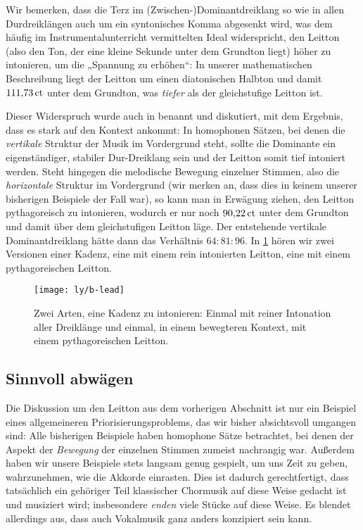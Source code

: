 Wir bemerken, dass die Terz im (Zwischen-)Dominantdreiklang so wie in allen
Durdreiklängen auch um ein syntonisches Komma abgesenkt wird, was dem häufig im
Instrumentalunterricht vermittelten Ideal widerspricht, den Leitton (also den
Ton, der eine kleine Sekunde unter dem Grundton liegt) höher zu intonieren, um
die „Spannung zu erhöhen“: In unserer mathematischen Beschreibung liegt der
Leitton um einen diatonischen Halbton und damit $111{,}73\,\text{ct}$ unter dem
Grundton, was \emph{tiefer} als der gleichstufige Leitton ist.

Dieser Widerspruch wurde auch in \cite[211]{viitasaari} benannt und
diskutiert, mit dem Ergebnis, dass es stark auf den Kontext ankommt: In
homophonen Sätzen, bei denen die \emph{vertikale} Struktur der Musik im
Vordergrund steht, sollte die Dominante ein eigenständiger, stabiler
Dur-Dreiklang sein und der Leitton somit tief intoniert werden. Steht hingegen
die melodische Bewegung einzelner Stimmen, also die \emph{horizontale} Struktur
im Vordergrund (wir merken an, dass dies in keinem unserer bisherigen Beispiele
der Fall war), so kann man in Erwägung ziehen, den Leitton pythagoreisch zu
intonieren, wodurch er nur noch $90{,}22\,\text{ct}$ unter dem Grundton und damit über
dem gleichstufigen Leitton läge. Der entstehende vertikale Dominantdreiklang
hätte dann das Verhältnis $64:81:96$. In \cref{fig:lead} hören wir zwei
Versionen einer Kadenz, eine mit einem rein intonierten Leitton, eine mit einem
pythagoreischen Leitton.

\begin{figure}
  \centering
  \texttt{[image: ly/b-lead]}
  \caption{Zwei Arten, eine Kadenz zu intonieren: Einmal mit reiner
    Intonation aller Dreiklänge und einmal, in einem bewegteren Kontext, mit
    einem pythagoreischen Leitton.}\label{fig:lead}
\end{figure}

\subsection{Sinnvoll abwägen}
\label{sec:balance}

Die Diskussion um den Leitton aus dem vorherigen Abschnitt ist nur ein Beispiel
eines allgemeineren Priorisierungsproblems, das wir bisher absichtsvoll umgangen
sind: Alle bisherigen Beispiele haben homophone Sätze betrachtet, bei denen der
Aspekt der \emph{Bewegung} der einzelnen Stimmen zumeist nachrangig
war. Außerdem haben wir unsere Beispiele stets langsam genug gespielt, um uns
Zeit zu geben, wahrzunehmen, wie die Akkorde einrasten. Dies ist dadurch
gerechtfertigt, dass tatsächlich ein gehöriger Teil klassischer Chormusik auf
diese Weise gedacht ist und musiziert wird; insbesondere \emph{enden} viele
Stücke auf diese Weise. Es blendet allerdings aus, dass auch Vokalmusik ganz
anders konzipiert sein kann.

